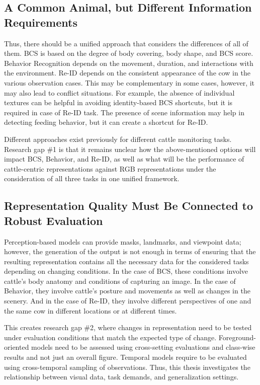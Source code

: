 \subsection{A Common Animal, but Different Information Requirements}

Thus, there should be a unified approach that considers the differences of all of them. BCS is based on the degree of body covering, body shape, and BCS score. Behavior Recognition depends on the movement, duration, and interactions with the environment. Re-ID depends on the consistent appearance of the cow in the various observation cases. This may be complementary in some cases, however, it may also lead to conflict situations. For example, the absence of individual textures can be helpful in avoiding identity-based BCS shortcuts, but it is required in case of Re-ID task. The presence of scene information may help in detecting feeding behavior, but it can create a shortcut for Re-ID.

Different approaches exist previously for different cattle monitoring tasks. Research gap \#1 is that it remains unclear how the above-mentioned options will impact BCS, Behavior, and Re-ID, as well as what will be the performance of cattle-centric representations against RGB representations under the consideration of all three tasks in one unified framework.

\subsection{Representation Quality Must Be Connected to Robust Evaluation}

Perception-based models can provide masks, landmarks, and viewpoint data; however, the generation of the output is not enough in terms of ensuring that the resulting representation contains all the necessary data for the considered tasks depending on changing conditions. In the case of BCS, these conditions involve cattle's body anatomy and conditions of capturing an image. In the case of Behavior, they involve cattle's posture and movements as well as changes in the scenery. And in the case of Re-ID, they involve different perspectives of one and the same cow in different locations or at different times.

This creates research gap \#2, where changes in representation need to be tested under evaluation conditions that match the expected type of change. Foreground-oriented models need to be assessed using cross-setting evaluations and class-wise results and not just an overall figure. Temporal models require to be evaluated using cross-temporal sampling of observations. Thus, this thesis investigates the relationship between visual data, task demands, and generalization settings.

